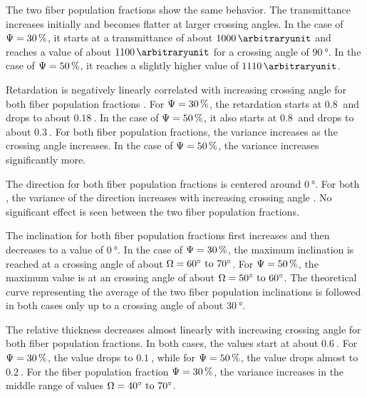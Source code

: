 The two fiber population fractions \modelPsi{} show the same behavior.
The transmittance increases initially and becomes flatter at larger crossing angles.
In the case of $\textnormal{$\Psi$} = \SI{30}{\percent}$, it starts at a transmittance of about $\SI{1000}{\arbitraryunit}$ and reaches a value of about $\SI{1100}{\arbitraryunit}$ for a crossing angle of $\SI{90}{\degree}$.
In the case of $\textnormal{$\Psi$} = \SI{50}{\percent}$, it reaches a slightly higher value of $\SI{1110}{\arbitraryunit}$.
\par
Retardation is negatively linearly correlated with increasing crossing angle for both fiber population fractions \modelPsi{}.
For $\textnormal{$\Psi$}=\SI{30}{\percent}$, the retardation starts at $\SI{0.8}{}$ and drops to about $\SI{0.18}{}$.
In the case of $\textnormal{$\Psi$}=\SI{50}{\percent}$, it also starts at $\SI{0.8}{}$ and drops to about $\SI{0.3}{}$.
For both fiber population fractions, the variance increases as the crossing angle increases.
In the case of $\textnormal{$\Psi$}=\SI{50}{\percent}$, the variance increases significantly more.
\par
The direction for both fiber population fractions \modelPsi{} is centered around $\SI{0}{\degree}$.
For both \modelPsi{}, the variance of the direction increases with increasing crossing angle \modelOmega{}.
No significant effect is seen between the two fiber population fractions.
\par
The inclination for both fiber population fractions first increases and then decreases to a value of $\SI{0}{\degree}$.
In the case of $\textnormal{$\Psi$}=\SI{30}{\percent}$, the maximum inclination is reached at a crossing angle of about $\modelOmega=\SIrange{60}{70}{\degree}$.
For $\textnormal{$\Psi$}=\SI{50}{\percent}$, the maximum value is at an crossing angle of about $\modelOmega=\SIrange{50}{60}{\degree}$.
The theoretical curve representing the average of the two fiber population inclinations is followed in both cases only up to a crossing angle of about $\SI{30}{\degree}$.
\par
The relative thickness \trel{} decreases almost linearly with increasing crossing angle \modelOmega{} for both fiber population fractions.
In both cases, the \trel{} values start at about $\SI{0.6}{}$.
For $\textnormal{$\Psi$} = \SI{30}{\percent}$, the \trel{} value drops to $\SI{0.1}{}$, while for $\textnormal{$\Psi$} = \SI{50}{\percent}$, the \trel{} value drops almost to $\SI{0.2}{}$.
For the fiber population fraction $\textnormal{$\Psi$} = \SI{30}{\percent}$, the variance increases in the middle range of values $\modelOmega=\SIrange{40}{70}{\degree}$.
